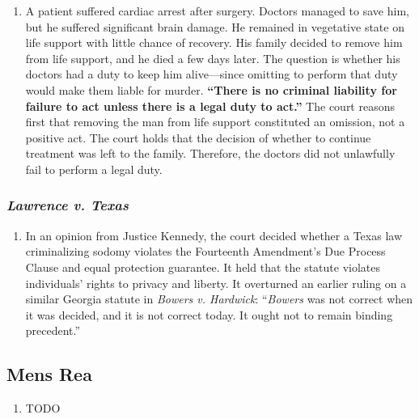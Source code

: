 \begin{enumerate}
    \item A patient suffered cardiac arrest after surgery. Doctors managed to save him, but he suffered significant brain damage. He remained in vegetative state on life support with little chance of recovery. His family decided to remove him from life support, and he died a few days later. The question is whether his doctors had a duty to keep him alive---since omitting to perform that duty would make them liable for murder. \textbf{``There is no criminal liability for failure to act unless there is a legal duty to act.''} The court reasons first that removing the man from life support constituted an omission, not a positive act. The court holds that the decision of whether to continue treatment was left to the family. Therefore, the doctors did not unlawfully fail to perform a legal duty.
\end{enumerate}

\subsubsection{\emph{Lawrence v. Texas}}

\begin{enumerate}
    \item In an opinion from Justice Kennedy, the court decided whether a Texas law criminalizing sodomy violates the Fourteenth Amendment's Due Process Clause and equal protection guarantee. It held that the statute violates individuals' rights to privacy and liberty. It overturned an earlier ruling on a similar Georgia statute in \emph{Bowers v. Hardwick}: ``\emph{Bowers} was not correct when it was decided, and it is not correct today. It ought not to remain binding precedent.''
\end{enumerate}

\subsection{Mens Rea}

\begin{enumerate}
    \item TODO
\end{enumerate}

